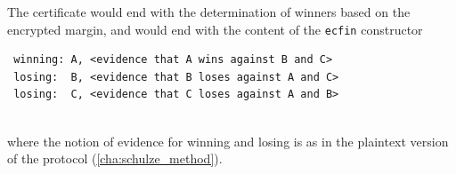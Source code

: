  The certificate would end with the determination of winners based
 on the encrypted margin, and would end with the content of the
 \texttt{ecfin} constructor

 {\small\begin{verbatim}
 winning: A, <evidence that A wins against B and C>
 losing:  B, <evidence that B loses against A and C>
 losing:  C, <evidence that C loses against A and B>
 \end{verbatim}}

 \mbox{}\\[-5ex]
 where the notion of evidence for winning and losing is as in the
 plaintext version of the protocol (\ref{cha:schulze_method}).  
 
%
